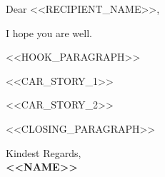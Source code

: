 \documentclass[11pt,a4paper]{article}
\begin{document}
\noindent Dear <<RECIPIENT_NAME>>,

I hope you are well.

<<HOOK_PARAGRAPH>>

<<CAR_STORY_1>>

<<CAR_STORY_2>>

<<CLOSING_PARAGRAPH>>

\vspace{2em}
\noindent Kindest Regards,\\
\textbf{<<NAME>>}
\end{document}
